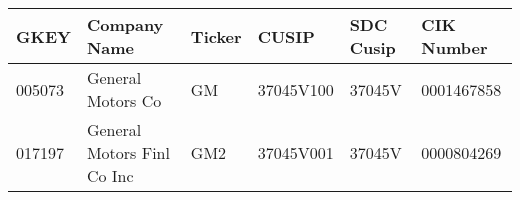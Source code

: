 

\begin{longtable}{ l l l l l l }\hline\hline
   GKEY &    Company Name &    Ticker &    CUSIP &    SDC Cusip &    CIK Number\\ 
\hline\endhead
   005073 &    General Motors Co &    GM &    37045V100 &    37045V &    0001467858\\ 
   017197 &    General Motors Finl Co Inc &    GM2 &    37045V001 &    37045V &    0000804269\\ 
\hline\hline\end{longtable}

